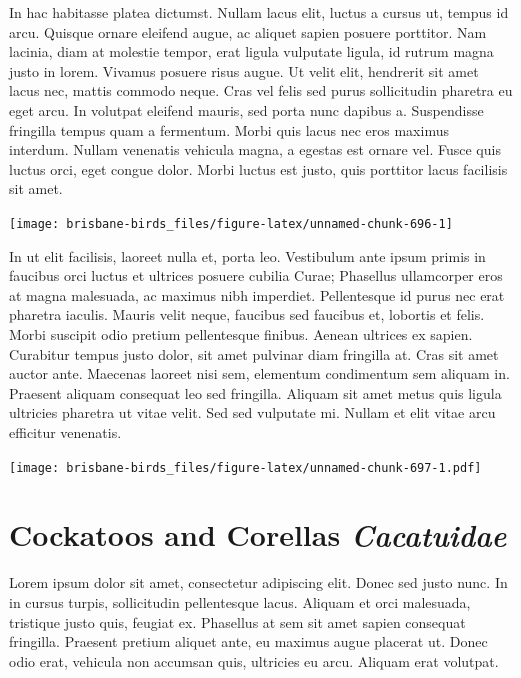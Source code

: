 \documentclass[]{book}
\let\origfigure\figure
\let\endorigfigure\endfigure
\renewenvironment{figure}[1][2] {
  \expandafter\origfigure\expandafter[H]
} {
  \endorigfigure
}
\begin{document}
In hac habitasse platea dictumst. Nullam lacus elit, luctus a cursus ut,
tempus id arcu. Quisque ornare eleifend augue, ac aliquet sapien posuere
porttitor. Nam lacinia, diam at molestie tempor, erat ligula vulputate
ligula, id rutrum magna justo in lorem. Vivamus posuere risus augue. Ut
velit elit, hendrerit sit amet lacus nec, mattis commodo neque. Cras vel
felis sed purus sollicitudin pharetra eu eget arcu. In volutpat eleifend
mauris, sed porta nunc dapibus a. Suspendisse fringilla tempus quam a
fermentum. Morbi quis lacus nec eros maximus interdum. Nullam venenatis
vehicula magna, a egestas est ornare vel. Fusce quis luctus orci, eget
congue dolor. Morbi luctus est justo, quis porttitor lacus facilisis sit
amet.

\begin{figure}
\texttt{[image: brisbane-birds\_files/figure-latex/unnamed-chunk-696-1]} \caption{insert figure caption}\label{fig:unnamed-chunk-696}
\end{figure}

In ut elit facilisis, laoreet nulla et, porta leo. Vestibulum ante ipsum
primis in faucibus orci luctus et ultrices posuere cubilia Curae;
Phasellus ullamcorper eros at magna malesuada, ac maximus nibh
imperdiet. Pellentesque id purus nec erat pharetra iaculis. Mauris velit
neque, faucibus sed faucibus et, lobortis et felis. Morbi suscipit odio
pretium pellentesque finibus. Aenean ultrices ex sapien. Curabitur
tempus justo dolor, sit amet pulvinar diam fringilla at. Cras sit amet
auctor ante. Maecenas laoreet nisi sem, elementum condimentum sem
aliquam in. Praesent aliquam consequat leo sed fringilla. Aliquam sit
amet metus quis ligula ultricies pharetra ut vitae velit. Sed sed
vulputate mi. Nullam et elit vitae arcu efficitur venenatis.

\begin{figure}
\centering
\texttt{[image: brisbane-birds\_files/figure-latex/unnamed-chunk-697-1.pdf]}
\caption{\label{fig:unnamed-chunk-697}insert figure caption}
\end{figure}

\chapter{\texorpdfstring{Cockatoos and Corellas
\emph{Cacatuidae}}{Cockatoos and Corellas Cacatuidae}}\label{cockatoos-and-corellas-cacatuidae}

Lorem ipsum dolor sit amet, consectetur adipiscing elit. Donec sed justo
nunc. In in cursus turpis, sollicitudin pellentesque lacus. Aliquam et
orci malesuada, tristique justo quis, feugiat ex. Phasellus at sem sit
amet sapien consequat fringilla. Praesent pretium aliquet ante, eu
maximus augue placerat ut. Donec odio erat, vehicula non accumsan quis,
ultricies eu arcu. Aliquam erat volutpat.
\end{document}
